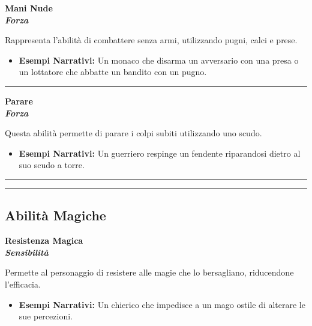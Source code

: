\documentclass[../manuale_main.tex]{subfiles}
\begin{document}
\begin{center}
\textbf{\large{Mani Nude}}\\ \textit{\textbf{Forza}}\\
\end{center}
Rappresenta l’abilità di combattere senza armi, utilizzando pugni, calci e prese.

\begin{itemize}
\item \textbf{Esempi Narrativi:} Un monaco che disarma un avversario con una presa o un lottatore che abbatte un bandito con un pugno.
\end{itemize}

\vspace{0.5cm}\rule{\textwidth}{0.4pt}\vspace{0.5cm}

\begin{center}
\textbf{\large{Parare}}\\ \textit{\textbf{Forza}}\\
\end{center}
Questa abilità permette di parare i colpi subiti utilizzando uno scudo.

\begin{itemize}
\item \textbf{Esempi Narrativi:} Un guerriero respinge un fendente riparandosi dietro al suo scudo a torre.
\end{itemize}

\vspace{0.5cm}\rule{\textwidth}{0.4pt}\vspace{0.5cm}

\vspace{0.5cm}
\rule{\textwidth}{0.4pt}
\vspace{0.5cm}

\subsection{Abilità Magiche}

\begin{center}
\textbf{\large{Resistenza Magica}}\\ \textit{\textbf{Sensibilità}}\\
\end{center}
Permette al personaggio di resistere alle magie che lo bersagliano, riducendone l'efficacia.

\begin{itemize}
\item \textbf{Esempi Narrativi:} Un chierico che impedisce a un mago ostile di alterare le sue percezioni.
\end{itemize}
\end{document}
